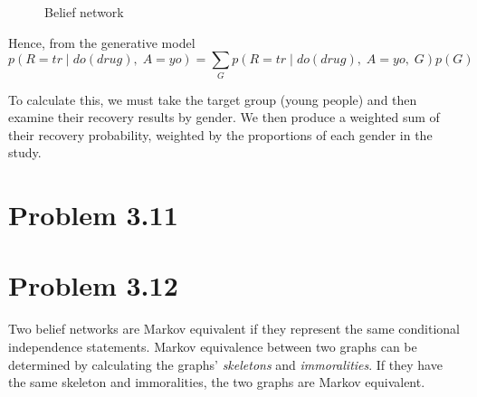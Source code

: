 \documentclass[11pt,a4paper,oneside]{report}
\newcommand{\hilight}[1]{\colorbox{yellow}{#1}}
\begin{document}
\begin{figure}[H]
  \centering
    \caption{Belief network}
    \label{fig:do_calc_DAG}    
\end{figure}

Hence, from the generative model
\begin{equation}
p(R=tr \; | \; do(drug),\; A=yo) =
\sum\limits_{G} p(R=tr \; | \; do(drug), \; A=yo, \; G) p(G)
\end{equation}

To calculate this, we must take the target group (young people) and then examine their
recovery results by gender. We then produce a weighted sum of their recovery
probability, weighted by the proportions of each gender in the study. 


\section*{Problem 3.11}


\section*{Problem 3.12}
Two belief networks are Markov equivalent if they represent the same conditional
independence statements. Markov equivalence between two graphs can be determined
by calculating the graphs' \emph{skeletons} and \emph{immoralities}. If they
have the same skeleton and immoralities, the two graphs are Markov equivalent.
\end{document}
